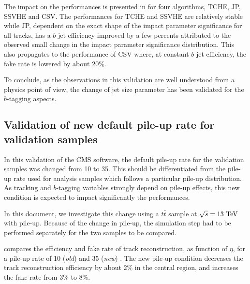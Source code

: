     The impact on the performances is presented in 
    for four algorithms, TCHE, JP, SSVHE and CSV. The performances for TCHE and SSVHE
    are relatively stable while JP, dependent on the exact shape of the impact parameter
    significance for all tracks, has a $b$ jet efficiency improved by a few percents attributed to the
    observed small change in the impact parameter significance distribution. This also propagates to the
    performance of CSV where, at constant $b$ jet efficiency, the fake rate is lowered
    by about 20\%.

    To conclude, as the observations in this validation are well understood from a physics
    point of view, the change of jet size parameter has been validated for
    the $b$-tagging aspects.

    \subsection{Validation of new default pile-up rate for validation samples}

    In this validation of the CMS software, the default pile-up rate for the validation
    samples was changed from 10 to 35. This should be differentiated from the pile-up rate
    used for analysis samples which follows a particular pile-up distribution.
    As tracking and $b$-tagging variables strongly depend on pile-up effects, this
    new condition is expected to impact significantly the performances.

    In this document, we investigate this change using a $t\bar{t}$ sample at $\sqrt{s} = 13~\text{TeV}$
    with pile-up. Because of the change in pile-up, the simulation step had to be performed
    separately for the two samples to be compared.

     compares the efficiency and fake rate of track
    reconstruction, as function of $\eta$, for a pile-up rate of 10 (\emph{old}) and
    35 (\emph{new}) \cite{TrackingNewPUComparison}. The new pile-up condition decreases the track reconstruction
    efficiency by about 2\% in the central region, and increases the fake rate from
    3\% to 8\%.


